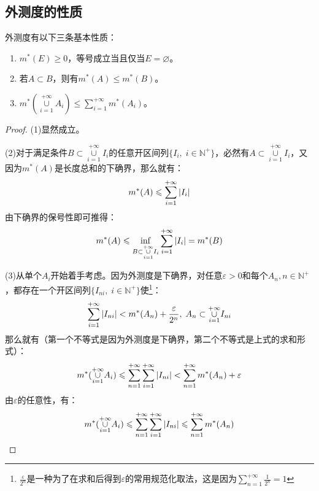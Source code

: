 \subsection{外测度的性质}
\begin{property}
	外测度有以下三条基本性质：
	\begin{enumerate}
		\item $m^*(E)\geqslant0$，等号成立当且仅当$E=\varnothing$。
		\item 若$A\subset B$，则有$m^*(A)\leqslant m^*(B)$。
		\item 	$m^*(\underset{i=1}{\overset{+\infty}{\cup}}A_i)\leqslant\sum\limits_{i=1}^{+\infty}m^*(A_i)$。
	\end{enumerate}
\end{property}
\begin{proof}
	(1)显然成立。\par
	(2)对于满足条件$B\subset\underset{i=1}{\overset{+\infty}{\cup}}I_i$的任意开区间列$\{I_i,\;i\in\mathbb{N}^+\}$，必然有$A\subset\underset{i=1}{\overset{+\infty}{\cup}}I_i$，又因为$m^*(A)$是长度总和的下确界，那么就有：
	\begin{equation}
		m^*(A)\leqslant\sum_{i=1}^{+\infty}|I_i|\notag
	\end{equation}
	由下确界的保号性即可推得：
	\begin{equation}
		m^*(A)\leqslant\inf_{B\subset\underset{i=1}{\overset{+\infty}{\cup}}I_i}\sum_{i=1}^{+\infty}|I_i|=m^*(B)\notag
	\end{equation}\par
	(3)从单个$A_i$开始着手考虑。因为外测度是下确界，对任意$\varepsilon>0$和每个$A_n,n\in\mathbb{N}^+$，都存在一个开区间列$\{I_{ni},\;i\in\mathbb{N}^+\}$使\footnote{$\frac{\varepsilon}{2^n}$是一种为了在求和后得到$\varepsilon$的常用规范化取法，这是因为$\sum\limits_{n=1}^{+\infty}\frac{1}{2^n}=1$}：
	\begin{equation}
		\sum_{i=1}^{+\infty}|I_{ni}|<m^*(A_n)+\frac{\varepsilon}{2^n},\;A_n\subset\underset{i=1}{\overset{+\infty}{\cup}}I_{ni}\notag
	\end{equation}
	那么就有（第一个不等式是因为外测度是下确界，第二个不等式是上式的求和形式）：
	\begin{equation}
		m^*(\underset{i=1}{\overset{+\infty}{\cup}}A_i)\leqslant\sum_{n=1}^{+\infty}\sum_{i=1}^{+\infty}|I_{ni}|<\sum_{n=1}^{+\infty} m^*(A_n)+\varepsilon\notag
	\end{equation}
	由$\varepsilon$的任意性，有：
	\begin{equation*}
		m^*(\underset{i=1}{\overset{+\infty}{\cup}}A_i)\leqslant\sum_{n=1}^{+\infty}\sum_{i=1}^{+\infty}|I_{ni}|\leqslant\sum_{n=1}^{+\infty} m^*(A_n)\qedhere 
	\end{equation*} 
\end{proof}
